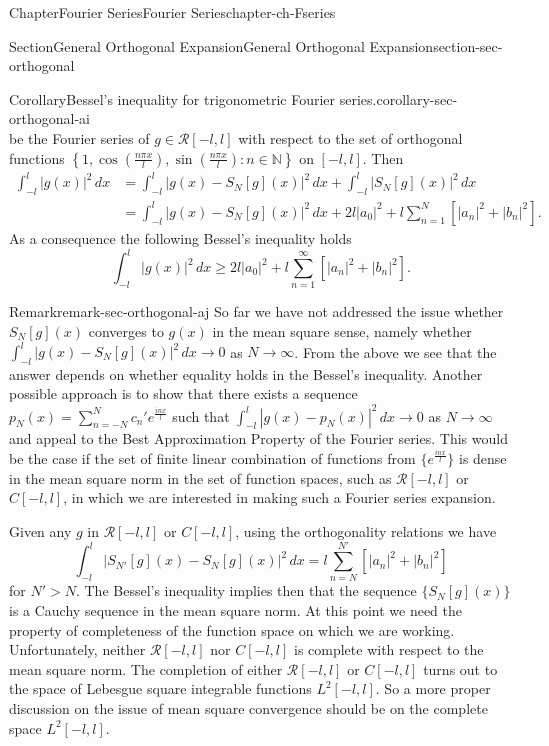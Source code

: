 \documentclass[oneside,10pt,]{book}
\numberwithin{equation}{section}
\newcommand{\cR}{\mathcal{R}}
\newcommand{\gt}{>}
\newcommand{\amp}{&}
\begin{document}
\begin{chapterptx}{Chapter}{Fourier Series}{}{Fourier Series}{}{}{chapter-ch-Fseries}
\begin{sectionptx}{Section}{General Orthogonal Expansion}{}{General Orthogonal Expansion}{}{}{section-sec-orthogonal}
\begin{corollary}{Corollary}{Bessel's inequality for trigonometric Fourier series.}{}{corollary-sec-orthogonal-ai}
\begin{equation*}
\end{equation*}
be the Fourier series of \(g\in \cR[-l, l]\) with respect to the set of orthogonal functions \(\left\{ 1,  \cos \left(\frac{n \pi x}{l}\right), \sin \left(\frac{n \pi x}{l}\right) : n\in\mathbb N\right\}\) on \([-l, l]\). Then%
\begin{align}
\int_{-l}^{l} |g(x)|^{2}\, dx\amp = \int_{-l}^{l} |g(x)-S_{N}[g](x)|^{2}\, dx+\int_{-l}^{l} |S_{N}[g](x)|^{2}\, dx \label{mrow-sec-orthogonal-ai-b-e-a}\\
\amp = \int_{-l}^{l} |g(x)-S_{N}[g](x)|^{2}\, dx+ 2l |a_{0}|^{2}+l \sum_{n=1}^{N} \left[ |a_{n}|^{2}+|b_{n}|^{2}\right].\label{mrow-parseval}
\end{align}
As a consequence the following Bessel's inequality holds%
\begin{equation*}
\int_{-l}^{l} |g(x)|^{2}\, dx \ge 2l |a_{0}|^{2}+l \sum_{n=1}^{\infty} \left[ |a_{n}|^{2}+|b_{n}|^{2}\right].
\end{equation*}
\end{corollary}
\begin{remark}{Remark}{}{remark-sec-orthogonal-aj}%
So far we have not addressed the issue whether \(S_{N}[g](x)\) converges to \(g(x)\) in the mean square sense, namely whether \(\int_{-l}^{l} |g(x)-S_{N}[g](x)|^{2}\, dx\to 0\) as \(N\to \infty\). From the above we see that the answer depends	on whether equality holds in the Bessel's inequality. Another possible approach is to show  that there exists a sequence \(p_{N}(x)=\sum_{n=-N}^{N}c_{n }' e^{\frac{i nx}{l}}\) such that \(\int_{-l}^{l} |g(x)-p_{N}(x)|^{2}\, dx\to 0\) as \(N\to \infty\) and appeal to the Best Approximation Property of the Fourier series. This would be the case if the set of finite linear combination of functions from \(\{ e^{\frac{i nx}{l}}\}\) is dense in the mean square norm  in the set of function spaces, such as \(\cR[-l, l]\) or \(C[-l, l]\), in which we are interested in making such a Fourier series expansion.%
\par
Given any \(g\) in \(\cR[-l, l]\) or \(C[-l, l]\), using the orthogonality relations we have%
\begin{equation*}
\int_{-l}^{l} |S_{N'}[g](x)-S_{N}[g](x)|^{2}\, dx =l \sum_{n=N}^{N'} \left[ |a_{n}|^{2}+|b_{n}|^{2}\right]
\end{equation*}
for \(N' \gt N\). The Bessel's inequality implies then that the sequence \(\{ S_{N}[g](x) \}\) is a Cauchy sequence in the mean square norm.  At this point we need the property of completeness of the function space on which we are working. Unfortunately, neither \(\cR[-l, l]\) nor \(C[-l, l]\) is complete with respect to the mean square norm. The completion of either \(\cR[-l, l]\) or \(C[-l, l]\) turns out to the space of  Lebesgue square integrable functions \(L^{2}[-l, l]\).  So a more proper discussion on the issue of mean square convergence should be on the complete space \(L^{2}[-l, l]\).%

\end{remark}
\end{sectionptx}
\end{chapterptx}
\end{document}
